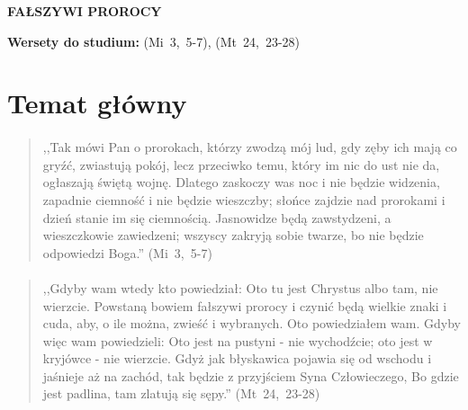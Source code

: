 \documentclass[10pt,a4paper,oneside]{article}
\begin{document}
\centerline{\textbf{\MakeUppercase{Fałszywi prorocy}}}
\begin{center}
\textbf{Wersety do studium:} \mbox{(Mi 3, 5-7)}, \mbox{(Mt 24, 23-28)}
\end{center}
\section{Temat główny}
\paragraph{}
\begin{quote}
,,Tak mówi Pan o prorokach, którzy zwodzą mój lud, gdy zęby ich mają co gryźć, zwiastują pokój, lecz przeciwko temu, który im nic do ust nie da, ogłaszają świętą wojnę. Dlatego zaskoczy was noc i nie będzie widzenia, zapadnie ciemność i nie będzie wieszczby; słońce zajdzie nad prorokami i dzień stanie im się ciemnością. Jasnowidze będą zawstydzeni, a wieszczkowie zawiedzeni; wszyscy zakryją sobie twarze, bo nie będzie odpowiedzi Boga.'' \mbox{(Mi 3, 5-7)}
\end{quote}
\paragraph{}
\begin{quote}
,,Gdyby wam wtedy kto powiedział: Oto tu jest Chrystus albo tam, nie wierzcie. Powstaną bowiem fałszywi prorocy i czynić będą wielkie znaki i cuda, aby, o ile można, zwieść i wybranych. Oto powiedziałem wam. Gdyby więc wam powiedzieli: Oto jest na pustyni - nie wychodźcie; oto jest w kryjówce - nie wierzcie. Gdyż jak błyskawica pojawia się od wschodu i jaśnieje aż na zachód, tak będzie z przyjściem Syna Człowieczego, Bo gdzie jest padlina, tam zlatują się sępy.'' \mbox{(Mt 24, 23-28)}
\end{quote}
\end{document}
